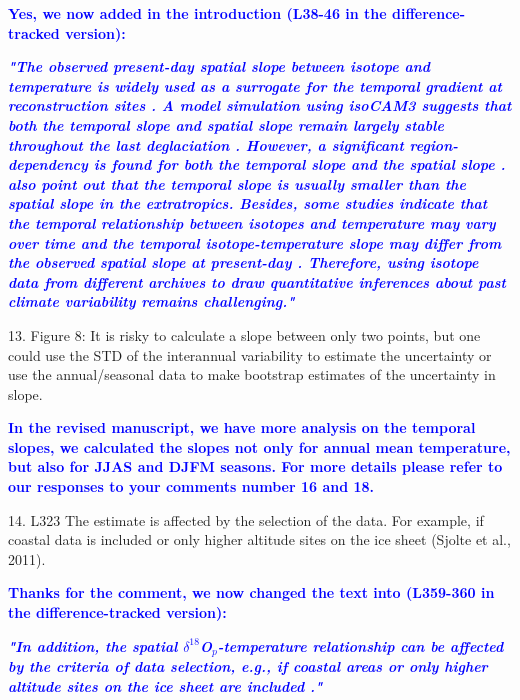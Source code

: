 \documentclass[gmd, manuscript]{copernicus}
\begin{document}
\medskip

\textcolor{blue}{\textbf{Yes, we now added in the introduction (L38-46 in the difference-tracked version):}}

\textcolor{blue}{\textbf{\textit{"The observed present-day spatial slope between isotope and temperature is widely used as a surrogate  for the temporal gradient at reconstruction sites \citep{cuffey1992toward,sime2009evidence,kindler2014temperature}. A model simulation using isoCAM3 suggests that both the temporal slope and spatial slope remain largely stable throughout the last deglaciation  \citep{guan2016understanding}. However, a significant region-dependency is found for both the temporal slope \citep{guan2016understanding} and the spatial slope \citep{sjolte2011modeling}. \citet{guan2016understanding} also point out that the temporal slope is usually smaller than the spatial slope in the extratropics. Besides, some studies indicate that the temporal relationship between isotopes and temperature may vary over time and the temporal isotope-temperature slope may differ from the observed spatial slope at present-day \citep[e.g.,][]{werner2000borehole,sjolte2014modelling}. Therefore, using isotope data from different archives to draw quantitative inferences about past climate variability remains challenging."}}}

\medskip
 

13. Figure 8: It is risky to calculate a slope between only two points, but one could use the STD of the interannual variability to estimate the uncertainty or use the annual/seasonal data to make bootstrap estimates of the uncertainty in slope.

\medskip

\textcolor{blue}{\textbf{In the revised manuscript, we have more analysis on the temporal slopes, we  calculated the slopes not only for annual mean temperature, but also for JJAS and DJFM seasons. For more details please refer to our responses to your comments number 16 and 18.}}

\medskip

14. L323 The estimate is affected by the selection of the data. For example, if coastal data is included or only higher altitude sites on the ice sheet (Sjolte et al., 2011).

\medskip

\textcolor{blue}{\textbf{Thanks for the comment, we now changed the text into (L359-360 in the difference-tracked version):}}

\textcolor{blue}{\textbf{\textit{"In addition,  the spatial $\delta^{18}$O$_p$-temperature relationship  can be affected by the criteria of data selection, e.g., if coastal areas or only higher altitude sites on the ice sheet are included \citep{sjolte2011modeling}."}}}
\end{document}
